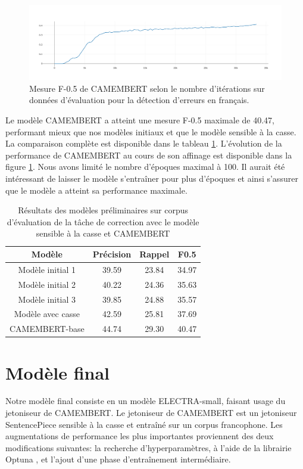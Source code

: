 \documentclass[12pt,twoside,rapport]{dms}
\theoremstyle{definition}
\numberwithin{equation}{section}
\numberwithin{table}{chapter}
\numberwithin{figure}{chapter}
\begin{document}
\begin{figure}
	\begin{center}
		\includegraphics[width=1.0\textwidth]{figures/camembertbasef05100epoquesnat.png}
	\end{center}
	\caption{Mesure F-0.5 de CAMEMBERT selon le nombre d'itérations sur
		données d'évaluation pour la détection d'erreurs en
		français.}\label{fig:f05camembert}
\end{figure}

Le modèle CAMEMBERT a atteint une mesure F-0.5 maximale de 40.47, performant
mieux que nos modèles initiaux et que le modèle sensible à la casse. La
comparaison complète est disponible dans le tableau
\ref{table:perf_initiaux_camembert}. L'évolution de la performance de CAMEMBERT
au cours de son affinage est disponible dans la figure \ref{fig:f05camembert}.
Nous avons limité le nombre d'époques maximal à 100. Il aurait été intéressant
de laisser le modèle s'entraîner pour plus d'époques et ainsi s'assurer que le
modèle a atteint sa performance maximale.

\begin{table}
	\centering
	\begin{tabular}{||c | c | c | c||}
		\hline
		Modèle            & Précision & Rappel & F0.5  \\ [0.5ex]
		\hline\hline
		Modèle initial 1  & 39.59     & 23.84  & 34.97 \\
		Modèle initial 2  & 40.22     & 24.36  & 35.63 \\
		Modèle initial 3  & 39.85     & 24.88  & 35.57 \\
		Modèle avec casse & 42.59     & 25.81  & 37.69 \\
		CAMEMBERT-base    & 44.74     & 29.30  & 40.47 \\
		\hline
	\end{tabular}
    \caption{Résultats des modèles préliminaires sur corpus d'évaluation de la
    tâche de correction avec le modèle sensible à la casse et CAMEMBERT}
	\label{table:perf_initiaux_camembert}
\end{table}


\chapter{Modèle final}\label{chapitre:meilleurmodele}
Notre modèle final consiste en un modèle ELECTRA-small, faisant usage du
jetoniseur de CAMEMBERT. Le jetoniseur de CAMEMBERT est un jetoniseur
SentencePiece sensible à la casse et entraîné sur un corpus francophone. Les
augmentations de performance les plus importantes proviennent des deux
modifications suivantes: la recherche d'hyperparamètres, à l'aide de la
librairie Optuna \cite{akiba2019optuna}, et l'ajout d'une phase d'entraînement
intermédiaire.
\end{document}
